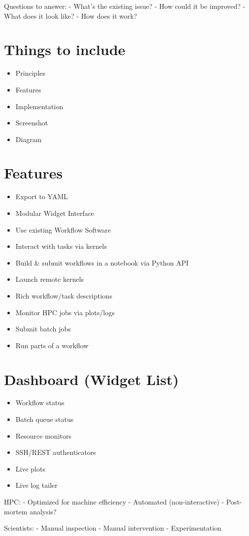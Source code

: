 Questions to answer: - What's the existing issue? - How could it be
improved? - What does it look like? - How does it work?

\section{Things to include}\label{things-to-include}

\begin{itemize}
\tightlist
\item
  Principles
\item
  Features
\item
  Implementation
\item
  Screenshot
\item
  Diagram
\end{itemize}

\section{Features}\label{features}

\begin{itemize}
\tightlist
\item
  Export to YAML
\item
  Modular Widget Interface
\item
  Use existing Workflow Software
\item
  Interact with tasks via kernels
\item
  Build \& submit workflows in a notebook via Python API
\item
  Launch remote kernels
\item
  Rich workflow/task descriptions
\item
  Monitor HPC jobs via plots/logs
\item
  Submit batch jobs
\item
  Run parts of a workflow
\end{itemize}

\section{Dashboard (Widget List)}\label{dashboard-widget-list}

\begin{itemize}
\tightlist
\item
  Workflow status
\item
  Batch queue status
\item
  Resource monitors
\item
  SSH/REST authenticators
\item
  Live plots
\item
  Live log tailer
\end{itemize}

HPC: - Optimized for machine efficiency - Automated (non-interactive) -
Post-mortem analysis?

Scientists: - Manual inspection - Manual intervention - Experimentation

